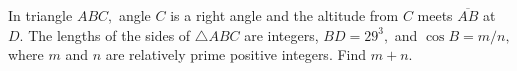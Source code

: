 In triangle $ABC,$ angle $C$ is a right angle and the altitude from $C$ meets $\overline{AB}$ at $D.$  The lengths of the sides of $\triangle ABC$ are integers, $BD=29^3,$ and $\cos B=m/n,$ where $m$ and $n$ are relatively prime positive integers.  Find $m+n.$